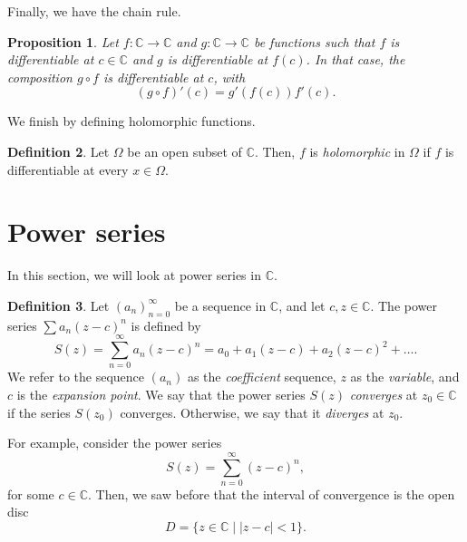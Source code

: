 \documentclass[a4paper, openany]{memoir}
\theoremstyle{definition}
\newtheorem{definition}{Definition}[section]
\theoremstyle{plain}
\newtheorem{proposition}[definition]{Proposition}
\begin{document}
\noindent Finally, we have the chain rule.
\begin{proposition}
Let $f: \mathbb{C} \to \mathbb{C}$ and $g: \mathbb{C} \to \mathbb{C}$ be functions such that $f$ is differentiable at $c \in \mathbb{C}$ and $g$ is differentiable at $f(c)$. In that case, the composition $g \circ f$ is differentiable at $c$, with
\[(g \circ f)'(c) = g'(f(c)) f'(c).\]
\end{proposition}

We finish by defining holomorphic functions.
\begin{definition}
Let $\Omega$ be an open subset of $\mathbb{C}$. Then, $f$ is \emph{holomorphic} in $\Omega$ if $f$ is differentiable at every $x \in \Omega$.
\end{definition}


\newpage

\section{Power series}
In this section, we will look at power series in $\mathbb{C}$.
\begin{definition}
Let $(a_n)_{n=0}^{\infty}$ be a sequence in $\mathbb{C}$, and let $c, z \in \mathbb{C}$. The power series $\sum a_n(z - c)^n$ is defined by
\[S(z) = \sum_{n=0}^{\infty} a_n (z - c)^n = a_0 + a_1(z - c) + a_2(z - c)^2 + \dots.\]
We refer to the sequence $(a_n)$ as the \emph{coefficient} sequence, $z$ as the \emph{variable}, and $c$ is the \emph{expansion point}. We say that the power series $S(z)$ \emph{converges} at $z_0 \in \mathbb{C}$ if the series $S(z_0)$ converges. Otherwise, we say that it \emph{diverges} at $z_0$. 
\end{definition}
For example, consider the power series
\[S(z) = \sum_{n=0}^{\infty} (z - c)^n,\]
for some $c \in \mathbb{C}$. Then, we saw before that the interval of convergence is the open disc
\[D = \{z \in \mathbb{C} \mid |z - c| < 1\}.\]
\end{document}
